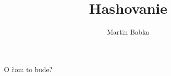 \documentclass[hyperref={pdfpagelabels=false}]{beamer}
\title{Hashovanie}
\author{Martin Babka}
\begin{document}

\frame{\titlepage}

\begin{frame}{O čom to bude?}
\tableofcontents
\end{frame}


\end{document}
